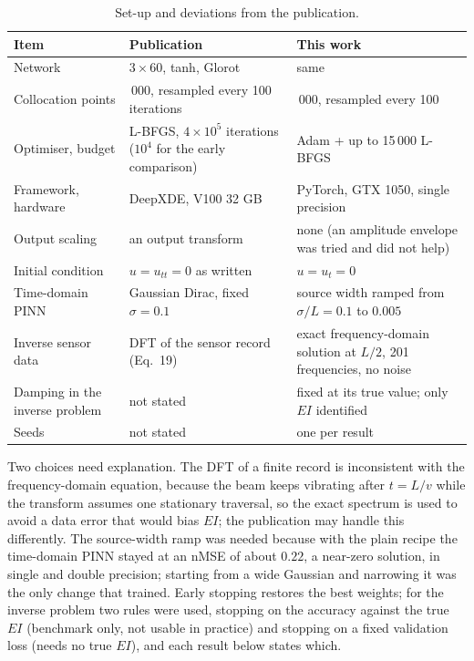\begin{table}[tbp]
\centering\footnotesize
\caption{Set-up and deviations from the publication.}\label{tab:vf-fd-setup}
\begin{tabularx}{\linewidth}{@{}>{\raggedright\arraybackslash}p{3.0cm} >{\raggedright\arraybackslash}X >{\raggedright\arraybackslash}X@{}}
\toprule
Item & Publication & This work\\
\midrule
Network & $3\times60$, tanh, Glorot & same\\
Collocation points & 20\,000, resampled every 100 iterations & 5\,000, resampled every 100\\
Optimiser, budget & L-BFGS, $4\times10^5$ iterations ($10^4$ for the early comparison) & 1000 Adam + up to 15\,000 L-BFGS\\
Framework, hardware & DeepXDE, V100 32 GB & PyTorch, GTX 1050, single precision\\
Output scaling & an output transform & none (an amplitude envelope was tried and did not help)\\
Initial condition & $u=u_{tt}=0$ as written & $u=u_t=0$\\
Time-domain PINN & Gaussian Dirac, fixed $\sigma=0.1$ & source width ramped from $\sigma/L=0.1$ to $0.005$\\
Inverse sensor data & DFT of the sensor record (Eq.~19) & exact frequency-domain solution at $L/2$, 201 frequencies, no noise\\
Damping in the inverse problem & not stated & fixed at its true value; only $EI$ identified\\
Seeds & not stated & one per result\\
\bottomrule
\end{tabularx}
\end{table}

Two choices need explanation. The DFT of a finite record is inconsistent with the frequency-domain equation, because the beam keeps vibrating after $t=L/v$ while the transform assumes one stationary traversal, so the exact spectrum is used to avoid a data error that would bias $EI$; the publication may handle this differently. The source-width ramp was needed because with the plain recipe the time-domain PINN stayed at an nMSE of about $0.22$, a near-zero solution, in single and double precision; starting from a wide Gaussian and narrowing it was the only change that trained. Early stopping restores the best weights; for the inverse problem two rules were used, stopping on the accuracy against the true $EI$ (benchmark only, not usable in practice) and stopping on a fixed validation loss (needs no true $EI$), and each result below states which.

